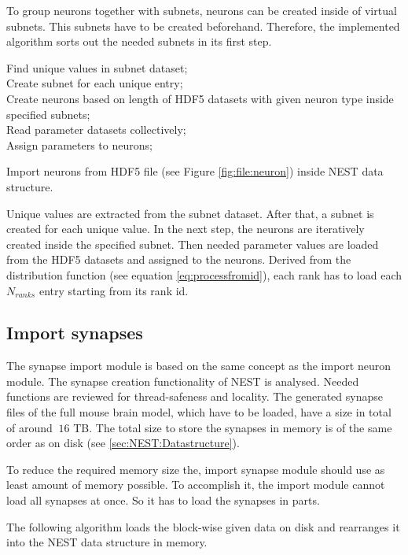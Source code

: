 To group neurons together with subnets, neurons can be created inside of virtual subnets.
This subnets have to be created beforehand.
Therefore, the implemented algorithm sorts out the needed subnets in its first step.
\begin{algorithm}[ht!]
 Find unique values in subnet dataset; \\
 Create subnet for each unique entry; \\
 Create neurons based on length of HDF5 datasets with given neuron type inside specified subnets; \\
 Read parameter datasets collectively; \\
 Assign parameters to neurons;\\
 \hspace{0.1cm}
\caption{Import neurons from HDF5 file (see Figure \ref{fig:file:neuron}) inside NEST data structure.}
\label{alg2}
\end{algorithm}
Unique values are extracted from the subnet dataset.
After that, a subnet is created for each unique value. 
In the next step, the neurons are iteratively created inside the specified subnet.
Then needed parameter values are loaded from the HDF5 datasets and assigned to the neurons.
Derived from the distribution function (see equation \ref{eq:processfromid}), each rank has to load each $N_{ranks}$
entry starting from its rank id.

\subsection{Import synapses}
The synapse import module is based on the same concept as the import neuron module.
The synapse creation functionality of NEST is analysed.
Needed functions are reviewed for thread-safeness and locality.
The generated synapse files of the full mouse brain model, which have to be loaded, have a size in total of around $~16$ TB.
The total size to store the synapses in memory is of the same order as on disk (see \ref{sec:NEST:Datastructure}).

To reduce the required memory size the, import synapse module should use as least amount of memory possible.
To accomplish it, the import module cannot load all synapses at once.
So it has to load the synapses in parts.

The following algorithm loads the block-wise given data on disk and rearranges it into
the NEST data structure in memory.

